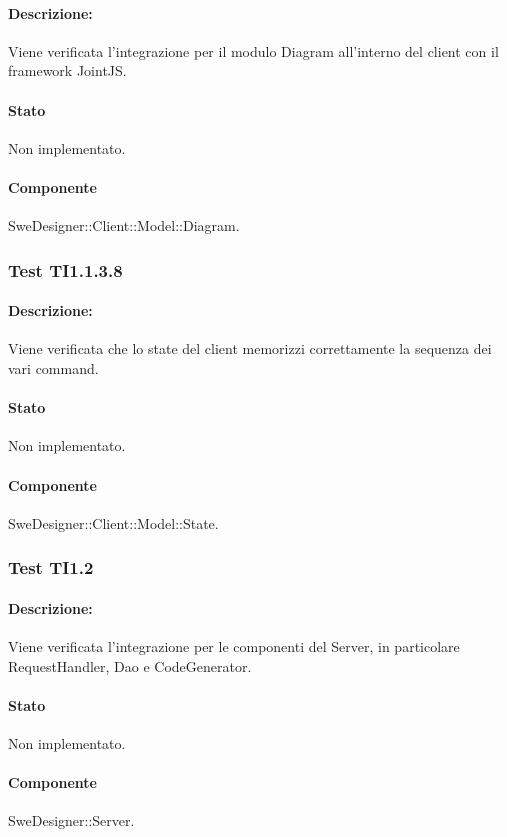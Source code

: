 \documentclass[../PianoDiQualifica.tex]{subfiles}
\begin{document}
	\paragraph{Descrizione:} Viene verificata l'integrazione per il modulo Diagram all'interno del client con il framework JointJS. 
	\paragraph{Stato} Non implementato.
	\paragraph{Componente} SweDesigner::Client::Model::Diagram.
	\subsubsection{Test TI1.1.3.8}
	\paragraph{Descrizione:} Viene verificata che lo state del client memorizzi correttamente la sequenza dei vari command. 
	\paragraph{Stato} Non implementato.
	\paragraph{Componente} SweDesigner::Client::Model::State.
	
	
	
	
	\subsubsection{Test TI1.2}
	\paragraph{Descrizione:} Viene verificata l'integrazione per le componenti del Server, in particolare RequestHandler, Dao e CodeGenerator.
	\paragraph{Stato} Non implementato.
	\paragraph{Componente} SweDesigner::Server.
	
\end{document}
